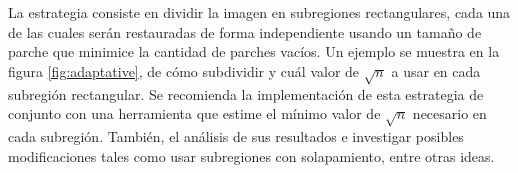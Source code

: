 La estrategia consiste en dividir la imagen en subregiones rectangulares, cada una de las cuales ser\'an restauradas de forma independiente usando un tamaño de parche que minimice la cantidad de parches vac\'ios. Un ejemplo se muestra en la figura \ref{fig:adaptative}, de c\'omo subdividir y cu\'al valor de $\sqrt{n}$ a usar en cada subregi\'on rectangular. Se recomienda la implementaci\'on de esta estrategia de conjunto con una herramienta que estime el m\'inimo valor de $\sqrt{n}$ necesario en cada subregi\'on. Tambi\'en, el análisis de sus resultados e investigar posibles modificaciones tales como usar subregiones con solapamiento, entre otras ideas.